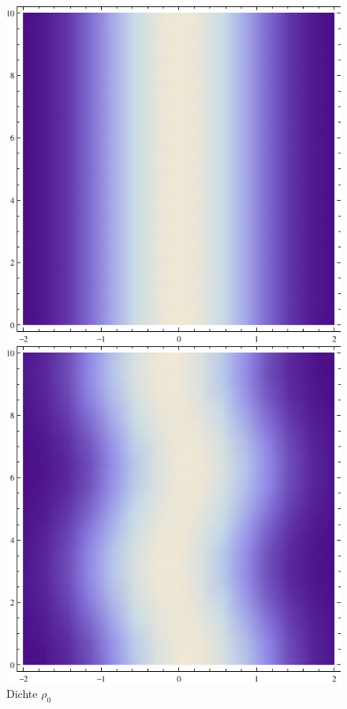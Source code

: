 \begin{figure}
	\begin{minipage}[t]{0.3\linewidth}
		\includegraphics[width=\textwidth]{H3-0.pdf}
		\caption{Dichte $\rho_0$}
		\label{fig:0}
	\end{minipage}
	\hfill
	\begin{minipage}[t]{0.3\linewidth}
		\includegraphics[width=\textwidth]{H3-1.pdf}

\end{minipage}
\end{figure}
